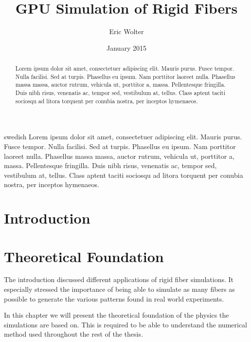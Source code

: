 \documentclass[a4paper,11pt]{kth-mag}
\title{GPU Simulation of Rigid Fibers}
\author{Eric Wolter}
\date{January 2015}
\begin{document}
\frontmatter
\pagestyle{empty}

\maketitle
{}
\begin{abstract}
Lorem ipsum dolor sit amet, consectetuer adipiscing elit. Mauris
purus. Fusce tempor. Nulla facilisi. Sed at turpis. Phasellus eu
ipsum. Nam porttitor laoreet nulla. Phasellus massa massa, auctor
rutrum, vehicula ut, porttitor a, massa. Pellentesque fringilla. Duis
nibh risus, venenatis ac, tempor sed, vestibulum at, tellus. Class
aptent taciti sociosqu ad litora torquent per conubia nostra, per
inceptos hymenaeos.
\end{abstract}

\clearpage


\begin{foreignabstract}{swedish}
Lorem ipsum dolor sit amet, consectetuer adipiscing elit. Mauris
purus. Fusce tempor. Nulla facilisi. Sed at turpis. Phasellus eu
ipsum. Nam porttitor laoreet nulla. Phasellus massa massa, auctor
rutrum, vehicula ut, porttitor a, massa. Pellentesque fringilla. Duis
nibh risus, venenatis ac, tempor sed, vestibulum at, tellus. Class
aptent taciti sociosqu ad litora torquent per conubia nostra, per
inceptos hymenaeos.
\end{foreignabstract}

\clearpage

\tableofcontents*

\clearpage

\listoflistings

\mainmatter
\pagestyle{newchap}

\chapter{Introduction}

\chapter{Theoretical Foundation}
\label{cha:theoretical_foundation}
The introduction discussed different applications of rigid fiber simulations. It especially stressed the importance of being able to simulate as many fibers as possible to generate the various patterns found in real world experiments.

In this chapter we will present the theoretical foundation of the physics the simulations are based on. This is required to be able to understand the numerical method used throughout the rest of the thesis.
\end{document}
